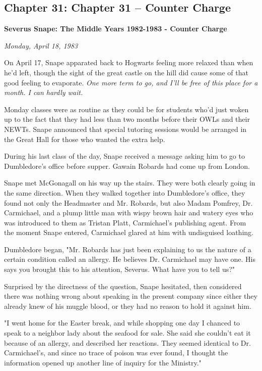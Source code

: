 \documentclass[a4paper,11pt]{article}
\begin{document}
\subsection{Chapter 31: Chapter 31 – Counter Charge}

\textbf{Severus Snape: The Middle Years 1982-1983 - Counter Charge}

\emph{Monday, April 18, 1983}

On April 17, Snape apparated back to Hogwarts feeling more relaxed than when he'd left, though the sight of the great castle on the hill did cause some of that good feeling to evaporate. \emph{One more term to go, and I'll be free of this place for a month. I can hardly wait.}

Monday classes were as routine as they could be for students who'd just woken up to the fact that they had less than two months before their OWLs and their NEWTs. Snape announced that special tutoring sessions would be arranged in the Great Hall for those who wanted the extra help.

During his last class of the day, Snape received a message asking him to go to Dumbledore's office before supper. Gawain Robards had come up from London.

Snape met McGonagall on his way up the stairs. They were both clearly going in the same direction. When they walked together into Dumbledore's office, they found not only the Headmaster and Mr. Robards, but also Madam Pomfrey, Dr. Carmichael, and a plump little man with wispy brown hair and watery eyes who was introduced to them as Tristan Platt, Carmichael's publishing agent. From the moment Snape entered, Carmichael glared at him with undisguised loathing.

Dumbledore began, "Mr. Robards has just been explaining to us the nature of a certain condition called an allergy. He believes Dr. Carmichael may have one. His says you brought this to his attention, Severus. What have you to tell us?"

Surprised by the directness of the question, Snape hesitated, then considered there was nothing wrong about speaking in the present company since either they already knew of his muggle blood, or they had no reason to hold it against him.

"I went home for the Easter break, and while shopping one day I chanced to speak to a neighbor lady about the seafood for sale. She said she couldn't eat it because of an allergy, and described her reactions. They seemed identical to Dr. Carmichael's, and since no trace of poison was ever found, I thought the information opened up another line of inquiry for the Ministry."
\end{document}
